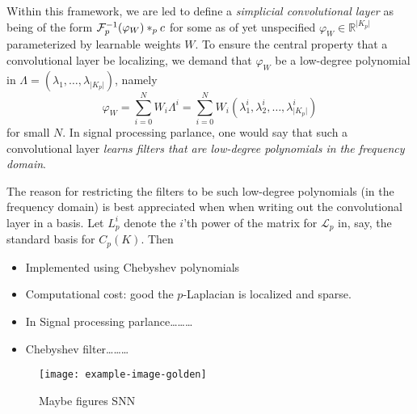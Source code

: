 Within this framework, we are led to define a \emph{simplicial convolutional layer} as being of the form $\mathcal{F}^{-1}_p(\varphi_W)\ast_p c$ for some as of yet unspecified $\varphi_W\in\mathbb{R}^{\lvert K_p \rvert}$ parameterized by learnable weights $W$. To ensure the central property that a convolutional layer be localizing, we demand that $\varphi_W$ be a low-degree polynomial in $\Lambda=(\lambda_1, \dotsc, \lambda_{\lvert K_p \rvert})$, namely
\begin{equation*}
  \varphi_W = \sum_{i=0}^N W_i\Lambda^i = \sum_{i=0}^N W_i(\lambda^i_1, \lambda^i_2, \dotsc, \lambda^i_{\lvert K_p \rvert})
\end{equation*}
for small $N$. In signal processing parlance, one would say that such a convolutional layer \emph{learns filters that are low-degree polynomials in the frequency domain}.

The reason for restricting the filters to be such low-degree polynomials (in the frequency domain) is best appreciated when when writing out the convolutional layer in a basis. Let $L^i_p$ denote the $i$'th power of the matrix for $\mathcal{L}_p$ in, say, the standard basis for $C_p(K)$. Then

\begin{itemize}
\item Implemented using Chebyshev polynomials
\item Computational cost: good the $p$-Laplacian is localized and sparse.
\item In Signal processing parlance………
\item Chebyshev filter………
\end{itemize}

\begin{figure}[htbp]
  \centering

\texttt{[image: example-image-golden]}
  \caption{Maybe figures SNN} \label{fig:SNN}
\end{figure}
